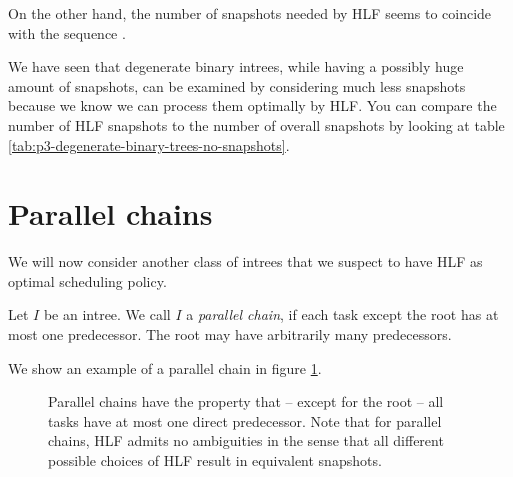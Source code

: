 On the other hand, the number of snapshots needed by HLF seems to coincide with the sequence \cite{oeisA055803}.

We have seen that degenerate binary intrees, while having a possibly huge amount of snapshots, can be examined by considering much less snapshots because we know we can process them optimally by HLF. You can compare the number of HLF snapshots to the number of overall snapshots by looking at table \ref{tab:p3-degenerate-binary-trees-no-snapshots}.

\section{Parallel chains}
\label{sec:p3-parallel-chains}

We will now consider another class of intrees that we suspect to have HLF as optimal scheduling policy.

\begin{definition}
  Let $I$ be an intree. We call $I$ a \emph{parallel chain}, if each task except the root has at most one predecessor. The root may have arbitrarily many predecessors.
\end{definition}

We show an example of a parallel chain in figure \ref{fig:parallel-chain-intro-figure}.

\begin{figure}[th]
  \centering
  \caption{Parallel chains have the property that -- except for the root -- all tasks have at most one direct predecessor. Note that for parallel chains, HLF admits no ambiguities in the sense that all different possible choices of HLF result in equivalent snapshots.}
  \label{fig:parallel-chain-intro-figure}
\end{figure}

